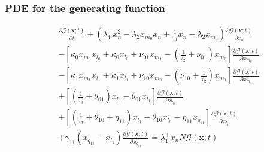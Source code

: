 \documentclass[a4paper, 11pt]{article}
\begin{document}
\subsubsection{PDE for the generating function}
\begin{equation*}
  \begin{split}
    & \frac{\partial\mathcal G(\mathbf x; t)}{\partial t} + \left(\lambda^+_1x_n^2-\lambda_2x_{m_0}x_n + \frac{1}{\tau_1}x_n - \lambda_2x_{m_0}\right)\frac{\partial\mathcal G(\mathbf x; t)}{\partial x_n}\\
    &- \left[\kappa_0x_{m_0}x_{l_0} + \kappa_0x_{l_0} + \nu_{01}x_{m_1} - \left(\frac{1}{\tau_2}+\nu_{01}\right)x_{m_0}\right]\frac{\partial \mathcal G(\mathbf x; t)}{\partial x_{m_0}}\\ & -\left[\kappa_1x_{m_1}x_{l_1} + \kappa_1x_{l_1} + \nu_{10}x_{m_0} - \left(\nu_{10}+\frac{1}{\tau_2}\right)x_{m_1}\right]\frac{\partial\mathcal G(\mathbf x; t)}{\partial x_{m_1}}\\
    &+\left[\left(\frac{1}{\tau_3}+\theta_{01}\right)x_{l_0} - \theta_{01}x_{l_1}\right]\frac{\partial\mathcal G(\mathbf x; t)}{\partial x_{l_0}}\\
    & + \left[\left(\frac{1}{\tau_3} + \theta_{10} + \eta_{11}\right)x_{l_1} - \theta_{10}x_{l_0} -\eta_{11}x_{q_{11}}\right]\frac{\partial\mathcal G(\mathbf x; t)}{\partial x_{l_1}}\\
    &+\gamma_{11}(x_{q_{11}} - x_{l_1})\frac{\partial\mathcal G(\mathbf x; t)}{\partial x_{q_{11}}} = \lambda_1^+x_nN\mathcal G(\mathbf x; t)
  \end{split}
\end{equation*}

\end{document}
